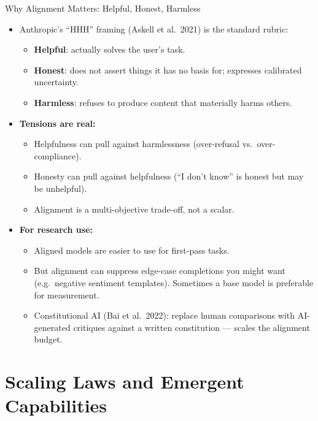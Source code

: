 \begin{frame}{Why Alignment Matters: Helpful, Honest, Harmless}
\begin{itemize}
\item Anthropic's ``HHH'' framing (Askell et al.\ 2021) is the standard rubric:
\begin{itemize}
\item \textbf{Helpful}: actually solves the user's task.
\item \textbf{Honest}: does not assert things it has no basis for; expresses calibrated uncertainty.
\item \textbf{Harmless}: refuses to produce content that materially harms others.
\end{itemize}

\medskip
\item \textbf{Tensions are real:}
\begin{itemize}
\item Helpfulness can pull against harmlessness (over-refusal vs.\ over-compliance).
\item Honesty can pull against helpfulness (``I don't know'' is honest but may be unhelpful).
\item Alignment is a multi-objective trade-off, not a scalar.
\end{itemize}

\medskip
\item \textbf{For research use:}
\begin{itemize}
\item Aligned models are easier to use for first-pass tasks.
\item But alignment can suppress edge-case completions you might want (e.g.\ negative sentiment templates). Sometimes a base model is preferable for measurement.
\item Constitutional AI (Bai et al.\ 2022): replace human comparisons with AI-generated critiques against a written constitution --- scales the alignment budget.
\end{itemize}
\end{itemize}
\end{frame}

\section{Scaling Laws and Emergent Capabilities}

